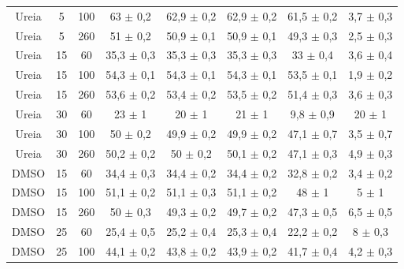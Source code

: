 \begin{table}[h]
{\begin{tabular}{c c c | c c c c c}
			  Ureia   & 5          & 100        & 63      \(\pm\) 0,2 & 62,9     \(\pm\) 0,2 & 62,9     \(\pm\) 0,2 & 61,5        \(\pm\) 0,2 & 3,7         \(\pm\) 0,3 \\
			  Ureia   & 5          & 260        & 51      \(\pm\) 0,2 & 50,9     \(\pm\) 0,1 & 50,9     \(\pm\) 0,1 & 49,3        \(\pm\) 0,3 & 2,5         \(\pm\) 0,3 \\ 
			  Ureia   & 15         & 60         & 35,3    \(\pm\) 0,3 & 35,3     \(\pm\) 0,3 & 35,3     \(\pm\) 0,3 & 33          \(\pm\) 0,4 & 3,6         \(\pm\) 0,4 \\
			  Ureia   & 15         & 100        & 54,3    \(\pm\) 0,1 & 54,3     \(\pm\) 0,1 & 54,3     \(\pm\) 0,1 & 53,5        \(\pm\) 0,1 & 1,9         \(\pm\) 0,2 \\
			  Ureia   & 15         & 260        & 53,6    \(\pm\) 0,2 & 53,4     \(\pm\) 0,2 & 53,5     \(\pm\) 0,2 & 51,4        \(\pm\) 0,3 & 3,6         \(\pm\) 0,3 \\ 
			  Ureia   & 30         & 60         & 23      \(\pm\) 1   & 20       \(\pm\) 1   & 21       \(\pm\) 1   & 9,8         \(\pm\) 0,9 & 20          \(\pm\) 1   \\
			  Ureia   & 30         & 100        & 50      \(\pm\) 0,2 & 49,9     \(\pm\) 0,2 & 49,9     \(\pm\) 0,2 & 47,1        \(\pm\) 0,7 & 3,5         \(\pm\) 0,7 \\
			  Ureia   & 30         & 260        & 50,2    \(\pm\) 0,2 & 50       \(\pm\) 0,2 & 50,1     \(\pm\) 0,2 & 47,1        \(\pm\) 0,3 & 4,9         \(\pm\) 0,3 \\  \midrule
			  DMSO    & 15         & 60         & 34,4    \(\pm\) 0,3 & 34,4     \(\pm\) 0,2 & 34,4     \(\pm\) 0,2 & 32,8        \(\pm\) 0,2 & 3,4         \(\pm\) 0,2 \\
			  DMSO    & 15         & 100        & 51,1    \(\pm\) 0,2 & 51,1     \(\pm\) 0,3 & 51,1     \(\pm\) 0,2 & 48          \(\pm\) 1   & 5           \(\pm\) 1   \\
			  DMSO    & 15         & 260        & 50      \(\pm\) 0,3 & 49,3     \(\pm\) 0,2 & 49,7     \(\pm\) 0,2 & 47,3        \(\pm\) 0,5 & 6,5         \(\pm\) 0,5 \\ 
			  DMSO    & 25         & 60         & 25,4    \(\pm\) 0,5 & 25,2     \(\pm\) 0,4 & 25,3     \(\pm\) 0,4 & 22,2        \(\pm\) 0,2 & 8           \(\pm\) 0,3 \\
			  DMSO    & 25         & 100        & 44,1    \(\pm\) 0,2 & 43,8     \(\pm\) 0,2 & 43,9     \(\pm\) 0,2 & 41,7        \(\pm\) 0,4 & 4,2         \(\pm\) 0,3 \\

\end{tabular}}
\end{table}
